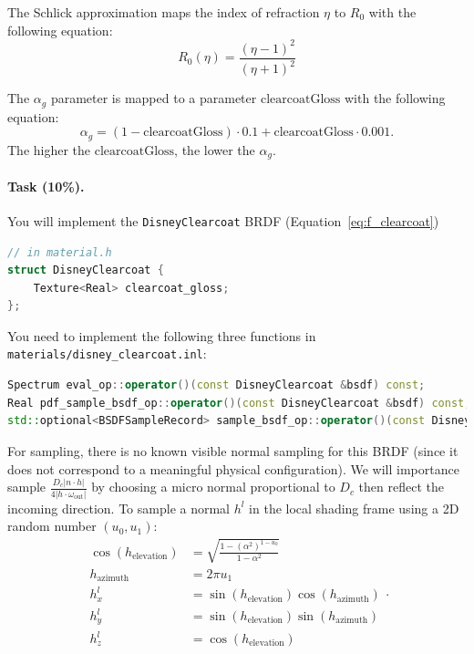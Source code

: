 The Schlick approximation maps the index of refraction $\eta$ to $R_0$ with the following equation:
\begin{equation}
R_0(\eta) = \frac{\left(\eta - 1\right)^2}{\left(\eta + 1\right)^2}
\end{equation}

The $\alpha_g$ parameter is mapped to a parameter $\text{clearcoatGloss}$ with the following equation:
\begin{equation}
\alpha_g = (1 - \text{clearcoatGloss}) \cdot 0.1 + \text{clearcoatGloss} \cdot 0.001.
\end{equation}
The higher the $\text{clearcoatGloss}$, the lower the $\alpha_g$.

\paragraph{Task (10\%).} You will implement the \lstinline{DisneyClearcoat} BRDF (Equation~\ref{eq:f_clearcoat})
\begin{lstlisting}[language=c++]
// in material.h
struct DisneyClearcoat {
    Texture<Real> clearcoat_gloss;
};
\end{lstlisting}

You need to implement the following three functions in \lstinline{materials/disney_clearcoat.inl}:
\begin{lstlisting}[language=c++]
Spectrum eval_op::operator()(const DisneyClearcoat &bsdf) const;
Real pdf_sample_bsdf_op::operator()(const DisneyClearcoat &bsdf) const;
std::optional<BSDFSampleRecord> sample_bsdf_op::operator()(const DisneyClearcoat &bsdf) const;
\end{lstlisting}

For sampling, there is no known visible normal sampling for this BRDF (since it does not correspond to a meaningful physical configuration). We will importance sample $\frac{D_c |n \cdot h|}{4 |h \cdot \omega_{\text{out}}|}$ by choosing a micro normal proportional to $D_c$ then reflect the incoming direction. To sample a normal $h^{l}$ in the local shading frame using a 2D random number $(u_0, u_1)$:
\begin{equation}
\begin{aligned}
\cos(h_{\text{elevation}}) &= \sqrt{\frac{1 - \left(\alpha^2\right)^{1 - u_0}}{1 - \alpha^2}} \\
h_{\text{azimuth}} &= 2 \pi u_1 \\
h^l_x &= \sin(h_{\text{elevation}}) \cos(h_{\text{azimuth}}) \\
h^l_y &= \sin(h_{\text{elevation}}) \sin(h_{\text{azimuth}}) \\
h^l_z &= \cos(h_{\text{elevation}})
\end{aligned}.
\end{equation}


